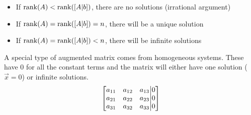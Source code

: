 \documentclass[11pt, fleqn]{article}
\begin{document}
\begin{itemize}
    \item If $\operatorname{rank}(A)<\operatorname{rank}(\left[ A|b \right])$, there are no solutions (irrational argument)
    \item If $\operatorname{rank}(A)=\operatorname{rank}(\left[ A|b \right])=n$, there will be a unique solution
    \item If $\operatorname{rank}(A)=\operatorname{rank}(\left[ A|b \right])<n$, there will be infinite solutions
\end{itemize}
A special type of augmented matrix comes from homogeneous systems. These have 0 for all the constant terms and the matrix will either have one solution ($\vec{x}=0$) or infinite solutions.
$$\augmatrix{a_{11}&a_{12}&a_{13}\\a_{21}&a_{22}&a_{23}\\a_{31}&a_{32}&a_{33}}{0\\0\\0}$$
\end{document}
